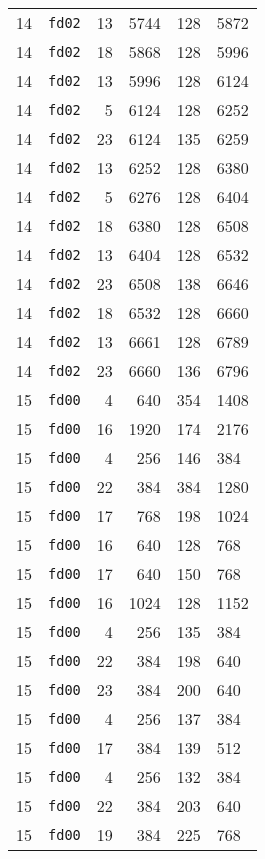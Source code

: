 \documentclass{article}
\begin{document}
\begin{table}[h!]
\begin{tabular}{llrrrl}
    14 & \texttt{fd02} & 13 & 5744 & 128 & 5872 \\
    14 & \texttt{fd02} & 18 & 5868 & 128 & 5996 \\
    14 & \texttt{fd02} & 13 & 5996 & 128 & 6124 \\
    14 & \texttt{fd02} & 5 & 6124 & 128 & 6252 \\
    14 & \texttt{fd02} & 23 & 6124 & 135 & 6259 \\
    14 & \texttt{fd02} & 13 & 6252 & 128 & 6380 \\
    14 & \texttt{fd02} & 5 & 6276 & 128 & 6404 \\
    14 & \texttt{fd02} & 18 & 6380 & 128 & 6508 \\
    14 & \texttt{fd02} & 13 & 6404 & 128 & 6532 \\
    14 & \texttt{fd02} & 23 & 6508 & 138 & 6646 \\
    14 & \texttt{fd02} & 18 & 6532 & 128 & 6660 \\
    14 & \texttt{fd02} & 13 & 6661 & 128 & 6789 \\
    14 & \texttt{fd02} & 23 & 6660 & 136 & 6796 \\
    15 & \texttt{fd00} & 4 & 640 & 354 & 1408 \\
    15 & \texttt{fd00} & 16 & 1920 & 174 & 2176 \\
    15 & \texttt{fd00} & 4 & 256 & 146 & 384 \\
    15 & \texttt{fd00} & 22 & 384 & 384 & 1280 \\
    15 & \texttt{fd00} & 17 & 768 & 198 & 1024 \\
    15 & \texttt{fd00} & 16 & 640 & 128 & 768 \\
    15 & \texttt{fd00} & 17 & 640 & 150 & 768 \\
    15 & \texttt{fd00} & 16 & 1024 & 128 & 1152 \\
    15 & \texttt{fd00} & 4 & 256 & 135 & 384 \\
    15 & \texttt{fd00} & 22 & 384 & 198 & 640 \\
    15 & \texttt{fd00} & 23 & 384 & 200 & 640 \\
    15 & \texttt{fd00} & 4 & 256 & 137 & 384 \\
    15 & \texttt{fd00} & 17 & 384 & 139 & 512 \\
    15 & \texttt{fd00} & 4 & 256 & 132 & 384 \\
    15 & \texttt{fd00} & 22 & 384 & 203 & 640 \\
    15 & \texttt{fd00} & 19 & 384 & 225 & 768 \\

\end{tabular}
\end{table}
\end{document}

